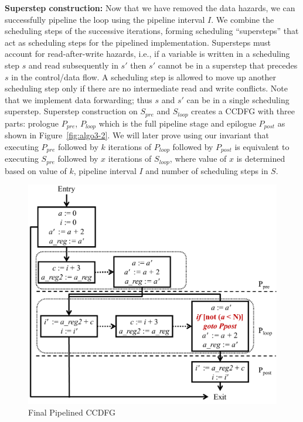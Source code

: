{\bf Superstep construction:} Now that we have removed the data hazards, we can successfully pipeline the loop using  the pipeline interval $I$. We combine the scheduling steps of the successive iterations, forming scheduling ``supersteps'' that act as scheduling steps for the pipelined
implementation. Supersteps must account for read-after-write hazards, i.e., if a variable is written in a scheduling step $s$ and read subsequently in $s'$ then $s'$ cannot be in a superstep that precedes $s$ in the control/data flow. A scheduling step is allowed to move up another scheduling step only if there are no intermediate read and write conflicts. Note that we implement data forwarding; thus $s$ and $s'$ can be in a single scheduling superstep.
Superstep construction on $S_{pre}$ and $S_{loop}$ creates a CCDFG with three parts: prologue $P_{pre}$, $P_{loop}$ which is the full pipeline stage and epilogue $P_{post}$ as shown in Figure~\ref{fig:algo3-2}. We will later prove using our invariant that executing $P_{pre}$ followed by $k$ iterations of $P_{loop}$ followed by $P_{post}$ is equivalent to executing $S_{pre}$ followed by $x$ iterations of $S_{loop}$, where value of $x$ is determined based on value of $k$, pipeline interval $I$ and number of scheduling steps in $S$.

\begin{figure}[t!]
\begin{center}
\includegraphics[width=5.5in]{fig-proposal/algorithm-after-adding-branches}
\end{center}
\caption{Final Pipelined CCDFG}
\label{fig:algo4}
\end{figure}


